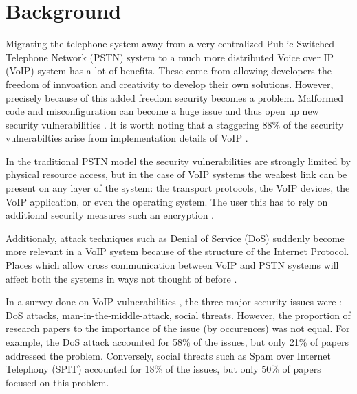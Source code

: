 \section{Background}


Migrating the telephone system away from a very centralized Public Switched Telephone Network (PSTN) system to a much more distributed Voice over IP (VoIP) system has a lot of benefits. These come from allowing developers the freedom of innvoation and creativity to develop their own solutions. However, precisely because of this added freedom security becomes a problem. Malformed code and misconfiguration can become a huge issue and thus open up new security vulnerabilities \cite{voipbg}. It is worth noting that a staggering 88\% of the security vulnerabilties arise from implementation details of VoIP \cite{keromytis}.

In the traditional PSTN model the security vulnerabilities are strongly limited by physical resource access, but in the case of VoIP systems the weakest link can be present on any layer of the system: the transport protocols, the VoIP devices, the VoIP application, or even the operating system. The user this has to rely on additional security measures such an encryption \cite{voipbg}. 

Additionaly, attack techniques such as Denial of Service (DoS) suddenly become more relevant in a VoIP system because of the structure of the Internet Protocol. Places which allow cross communication between VoIP and PSTN systems will affect both the systems in ways not thought of before \cite{voipbg}.

In a survey done on VoIP vulnerabilities \cite{keromytis}, the three major security issues were : DoS attacks, man-in-the-middle-attack, social threats. However, the proportion of research papers to the importance of the issue (by occurences) was not equal. For example, the DoS attack accounted for 58\% of the issues, but only 21\% of papers addressed the problem. Conversely, social threats such as Spam over Internet Telephony (SPIT) accounted for 18\% of the issues, but only 50\% of papers focused on this problem. 

